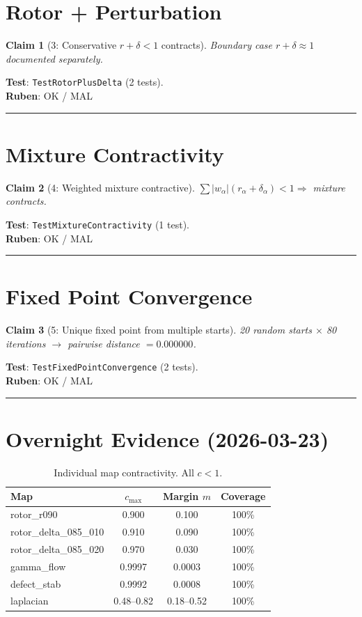 \documentclass[11pt,a4paper]{article}
\newtheorem{claim}{Claim}
\begin{document}
\section{Rotor + Perturbation}
\begin{claim}[3: Conservative $r + \delta < 1$ contracts]
Boundary case $r + \delta \approx 1$ documented separately.
\end{claim}
\noindent\textbf{Test}: \texttt{TestRotorPlusDelta} (2 tests).\\[4pt]
\textbf{Ruben}: OK / MAL \rule{3cm}{0.4pt}

\section{Mixture Contractivity}
\begin{claim}[4: Weighted mixture contractive]
$\sum |w_\alpha|(r_\alpha + \delta_\alpha) < 1 \Rightarrow$ mixture contracts.
\end{claim}
\noindent\textbf{Test}: \texttt{TestMixtureContractivity} (1 test).\\[4pt]
\textbf{Ruben}: OK / MAL \rule{3cm}{0.4pt}

\section{Fixed Point Convergence}
\begin{claim}[5: Unique fixed point from multiple starts]
20 random starts $\times$ 80 iterations $\to$ pairwise distance $= 0.000000$.
\end{claim}
\noindent\textbf{Test}: \texttt{TestFixedPointConvergence} (2 tests).\\[4pt]
\textbf{Ruben}: OK / MAL \rule{3cm}{0.4pt}

\section{Overnight Evidence (2026-03-23)}

\begin{table}[h]\centering
\begin{tabular}{lccc}
\toprule
Map & $c_{\max}$ & Margin $m$ & Coverage \\
\midrule
rotor\_r090 & 0.900 & 0.100 & 100\% \\
rotor\_delta\_085\_010 & 0.910 & 0.090 & 100\% \\
rotor\_delta\_085\_020 & 0.970 & 0.030 & 100\% \\
gamma\_flow & 0.9997 & 0.0003 & 100\% \\
defect\_stab & 0.9992 & 0.0008 & 100\% \\
laplacian & 0.48--0.82 & 0.18--0.52 & 100\% \\
\bottomrule
\end{tabular}
\caption{Individual map contractivity. All $c < 1$.}
\end{table}
\end{document}
